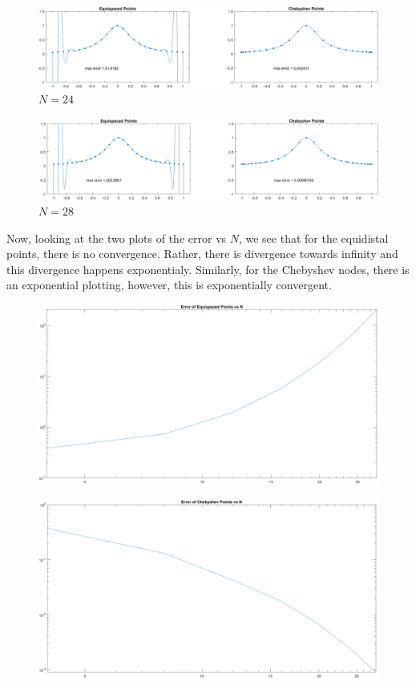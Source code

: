 \documentclass[12pt]{article}
\begin{document}
\begin{figure}[htp]
\centering
\includegraphics[scale=0.2]{5_124.PNG}
\caption{$N=24$}
\end{figure}
\begin{figure}[htp]
\centering
\includegraphics[scale=0.2]{5_128.PNG}
\caption{$N=28$}
\end{figure}

\newpage

Now, looking at the two plots of the error vs $N$, we see that for the equidistal points, there is no convergence. Rather, there is divergence towards infinity and this divergence happens exponentialy. Similarly, for the Chebyshev nodes, there is an exponential plotting, however, this is exponentially convergent.\\

\begin{figure}[htp]
\centering
\includegraphics[scale=0.12]{5_1equi.PNG}
\end{figure}
\begin{figure}[htp]
\centering
\includegraphics[scale=0.12]{5_1cheb.PNG}\\
\end{figure}
\end{document}
